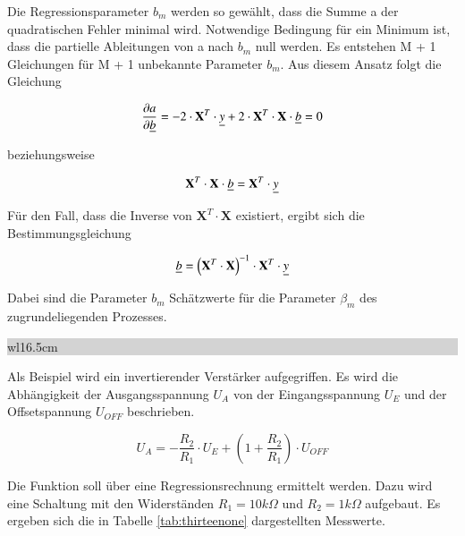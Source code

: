 \noindent Die Regressionsparameter $b_{m}$ werden so gew\"{a}hlt, dass die Summe a der quadratischen Fehler minimal wird. Notwendige Bedingung f\"{u}r ein Minimum ist, dass die partielle Ableitungen von a nach $b_{m}$ null werden. Es entstehen M + 1 Gleichungen f\"{u}r M + 1 unbekannte Parameter $b_{m}$. Aus diesem Ansatz folgt die Gleichung 

\begin{equation}\label{eq:thirteenten}
\frac{\partial a}{\partial \underline{b}} =-2\cdot \mathbf{X}^{T} \cdot \underline{y}+2\cdot \mathbf{X}^{T} \cdot \mathbf{X}\cdot \underline{b}=0
\end{equation}

\noindent beziehungsweise

\begin{equation}\label{eq:thirteeneleven}
\mathbf{X}^{T} \cdot \mathbf{X}\cdot \underline{b}=\mathbf{X}^{T} \cdot \underline{y}
\end{equation}

\noindent F\"{u}r den Fall, dass die Inverse von $\mathbf{X}^{T}\cdot \mathbf{X}$ existiert, ergibt sich die Bestimmungsgleichung 

\begin{equation}\label{eq:thirteentwelve}
\underline{b}=\left(\mathbf{X}^{T} \cdot \mathbf{X}\right)^{-1} \cdot \mathbf{X}^{T} \cdot \underline{y}
\end{equation}

\noindent Dabei sind die Parameter $b_{m}$ Sch\"{a}tzwerte f\"{u}r die Parameter $\beta_{m}$ des zugrundeliegenden Prozesses.\bigskip

\noindent
\colorbox{lightgray}{%
%
\renewcommand\arraystretch{0.6}%
\begin{tabular}{ wl{16.5cm} }
{\selectfont
{}}
\end{tabular}%
}\medskip

\noindent Als Beispiel wird ein invertierender Verst\"{a}rker aufgegriffen. Es wird die Abh\"{a}ngigkeit der Ausgangsspannung $U_{A}$ von der Eingangsspannung $U_{E}$ und der Offsetspannung $U_{OFF}$ beschrieben.

\begin{equation}\label{eq:thirteenthirteen}
U_{A} =-\frac{R_{2}}{R_{1}} \cdot U_{E} +\left(1+\frac{R_{2}}{R_{1}} \right)\cdot U_{OFF}
\end{equation}

\noindent Die Funktion soll \"{u}ber eine Regressionsrechnung ermittelt werden. Dazu wird eine Schaltung mit den Widerst\"{a}nden $R_{1} = 10 k\Omega$ und $R_{2} = 1 k\Omega$ aufgebaut. Es ergeben sich die in Tabelle \ref{tab:thirteenone} dargestellten Messwerte.

